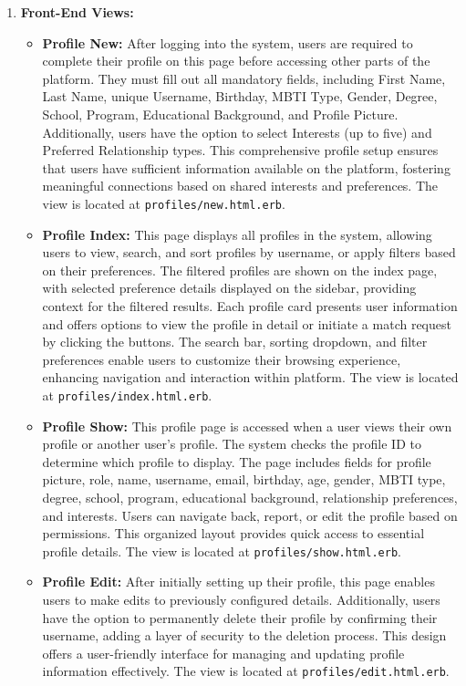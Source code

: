 \begin{enumerate}
    \newpage
    \item \textbf{Front-End Views:}
    \begin{itemize}
        \item \textbf{Profile New:} After logging into the system, users are required to complete their profile on this page before accessing other parts of the platform. They must fill out all mandatory fields, including First Name, Last Name, unique Username, Birthday, MBTI Type, Gender, Degree, School, Program, Educational Background, and Profile Picture. Additionally, users have the option to select Interests (up to five) and Preferred Relationship types. This comprehensive profile setup ensures that users have sufficient information available on the platform, fostering meaningful connections based on shared interests and preferences. The view is located at \texttt{profiles/new.html.erb}.
    
        
        \item \textbf{Profile Index:} This page displays all profiles in the system, allowing users to view, search, and sort profiles by username, or apply filters based on their preferences. The filtered profiles are shown on the index page, with selected preference details displayed on the sidebar, providing context for the filtered results. Each profile card presents user information and offers options to view the profile in detail or initiate a match request by clicking the buttons. The search bar, sorting dropdown, and filter preferences enable users to customize their browsing experience, enhancing navigation and interaction within platform. The view is located at \texttt{profiles/index.html.erb}.
    
        \item \textbf{Profile Show:} This profile page is accessed when a user views their own profile or another user’s profile. The system checks the profile ID to determine which profile to display. The page includes fields for profile picture, role, name, username, email, birthday, age, gender, MBTI type, degree, school, program, educational background, relationship preferences, and interests. Users can navigate back, report, or edit the profile based on permissions. This organized layout provides quick access to essential profile details. The view is located at \texttt{profiles/show.html.erb}.

        \item \textbf{Profile Edit:} After initially setting up their profile, this page enables users to make edits to previously configured details. Additionally, users have the option to permanently delete their profile by confirming their username, adding a layer of security to the deletion process. This design offers a user-friendly interface for managing and updating profile information effectively. The view is located at \texttt{profiles/edit.html.erb}.
    \end{itemize}\bigskip
    
\end{enumerate}
\clearpage \newpage
